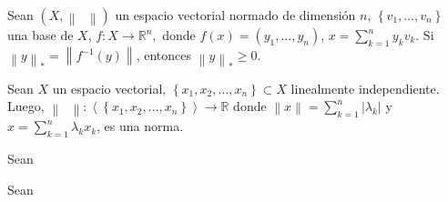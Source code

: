 \begin{prob}
	\label{prob9}
	Sean
	\begin{math}
		\left(
		X,
		\left\|
		\phantom{\cdot}
		\right\|
		\right)
	\end{math}
	un espacio vectorial normado de dimensión $n$,
	\begin{math}
		\left\{
		v_{1},\dotsc,
		v_{n}
		\right\}
	\end{math}
	una base de $X$,
	\begin{math}
		f\colon X\to\mathbb{R}^{n},
	\end{math}
	donde
	\begin{math}
		f\left(x\right)=
		\left(
		y_{1},
		\dotsc,
		y_{n}
		\right)
	\end{math},
	\begin{math}
		x=
		\sum_{k=1}^{n}
		y_{k}v_{k}
	\end{math}.
	Si
	\begin{math}
		{\left\|y\right\|}_{\ast}=
		\left\|
		f^{-1}
		\left(y\right)
		\right\|
	\end{math},
	entonces
	\begin{math}
		{\left\|y\right\|}_{\ast}\geq
		0
	\end{math}.
\end{prob}

\begin{prob}
	\label{prob10}
	Sean $X$ un espacio vectorial,
	\begin{math}
		\left\{
		x_{1},
		x_{2},
		\dotsc,
		x_{n}
		\right\}\subset X
	\end{math}
	linealmente independiente.
	Luego,
	\begin{math}
		\left\|
		\phantom{\cdot}
		\right\|\colon
		\left\langle
		\left\{
		x_{1},
		x_{2},
		\dotsc,
		x_{n}
		\right\}
		\right\rangle\to
		\mathbb{R}
	\end{math}
	donde
	\begin{math}
		\left\|
		x
		\right\|=
		\sum_{k=1}^{n}
		\left|
		\lambda_{k}
		\right|
	\end{math}
	y
	\begin{math}
		x=
		\sum_{k=1}^{n}
		\lambda_{k}x_{k}
	\end{math},
	es una norma.
\end{prob}

\begin{prob}
	\label{prob11}
	Sean
\end{prob}

\begin{prob}
	\label{prob12}
	Sean
\end{prob}

